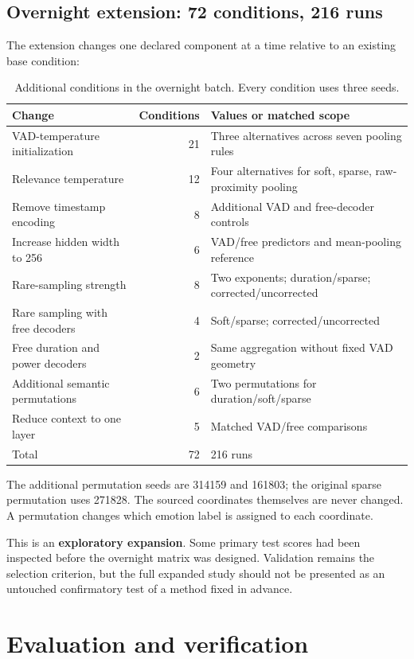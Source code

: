 \documentclass[11pt,a4paper]{article}
\begin{document}
\subsection{Overnight extension: 72 conditions, 216 runs}
The extension changes one declared component at a time relative to an existing base condition:
\begin{table}[htbp]\centering\small
\caption{Additional conditions in the overnight batch. Every condition uses three seeds.}
\begin{tabularx}{\linewidth}{p{5.2cm}rX}\toprule
Change & Conditions & Values or matched scope\\\midrule
VAD-temperature initialization & 21 & Three alternatives across seven pooling rules\\
Relevance temperature & 12 & Four alternatives for soft, sparse, raw-proximity pooling\\
Remove timestamp encoding & 8 & Additional VAD and free-decoder controls\\
Increase hidden width to 256 & 6 & VAD/free predictors and mean-pooling reference\\
Rare-sampling strength & 8 & Two exponents; duration/sparse; corrected/uncorrected\\
Rare sampling with free decoders & 4 & Soft/sparse; corrected/uncorrected\\
Free duration and power decoders & 2 & Same aggregation without fixed VAD geometry\\
Additional semantic permutations & 6 & Two permutations for duration/soft/sparse\\
Reduce context to one layer & 5 & Matched VAD/free comparisons\\\midrule
Total & 72 & 216 runs\\\bottomrule
\end{tabularx}\end{table}\FloatBarrier

The additional permutation seeds are 314159 and 161803; the original sparse permutation uses 271828. The sourced coordinates themselves are never changed. A permutation changes which emotion label is assigned to each coordinate.

This is an \textbf{exploratory expansion}. Some primary test scores had been inspected before the overnight matrix was designed. Validation remains the selection criterion, but the full expanded study should not be presented as an untouched confirmatory test of a method fixed in advance.

\section{Evaluation and verification}\label{sec:metrics}
\end{document}
